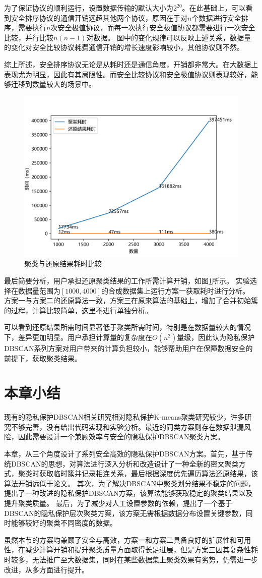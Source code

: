 为了保证协议的顺利运行，设置数据传输的默认大小为$ 2^{20} $。在此基础上，可以看到安全排序协议的通信开销远超其他两个协议，原因在于对$ n $个数据进行安全排序，需要执行$ n $次安全极值协议，而每一次执行安全极值协议都需要进行一次安全比较，并行比较$ n(n-1) $对数据。
图中的变化规律可以反映上述关系，数据量的变化对安全比较协议耗费通信开销的增长速度影响较小，其他协议则不然。

综上所述，安全排序协议无论是从耗时还是通信角度，开销都非常大。在大数据上表现尤为明显，因此有其局限性。而安全比较协议和安全极值协议则表现较好，能够迁移到数量较大的场景中。
\begin{figure}[htbp]
	\centering
	\includegraphics[width=0.6\linewidth]{img/testrc.png}
	\caption{聚类与还原结果耗时比较}
	\label{s4-exp-recover}
\end{figure}

最后简要分析，用户承担还原聚类结果的工作所需计算开销，如图\ref{s4-exp-recover}所示。
实验选择在数据量范围为$ [1000,4000] $的合成数据集上运行方案一获取耗时进行分析。
方案一与方案二的还原算法一致，方案三在原来算法的基础上，增加了合并初始簇的过程，计算比较简单，这里不进行单独分析。

可以看到还原结果所需时间显著低于聚类所需时间，特别是在数据量较大的情况下，差异更加明显。用户承担计算量的复杂度在$ O(n^2) $量级，因此认为隐私保护DBSCAN系列方案对用户带来的计算负担较小，能够帮助用户在保障数据安全的前提下，获取聚类结果。

\section{本章小结}
\label{s4-xiaojie}
现有的隐私保护DBSCAN相关研究相对隐私保护K-means聚类研究较少，许多研究不够完善，没有给出代码实现和实验分析。最近的同类方案\cite{bozdemir2021privacy}则存在数据泄漏风险，因此需要设计一个兼顾效率与安全的隐私保护DBSCAN聚类方案。

本章，从三个角度设计了系列安全高效的隐私保护DBSCAN方案。首先，基于传统DBSCAN的思想，对算法进行深入分析和改造设计了一种全新的密文聚类方式，聚类时获取临时簇并记录相连关系，最后根据深度优先遍历算法还原结果，该算法开销远低于论文\cite{bozdemir2021privacy}。
其次，为了解决DBSCAN中聚类划分结果不稳定的问题，提出了一种改进的隐私保护DBSCAN方案，该算法能够获取稳定的聚类结果以及提升聚类质量。
最后，为了减少对人工设置参数的依赖，提出了一个基于DBSCAN的隐私保护层次聚类方案，该方案无需根据数据分布设置关键参数，同时能够较好的聚类不同密度的数据。

虽然本节的方案均兼顾了安全与高效，方案一和方案二具备良好的扩展性和可用性，在减少计算开销和提升聚类质量方面取得长足进展，但是方案三因其复杂性耗时较多，无法推广至大数据集，同时在某些数据集上聚类效果有劣势，仍需进一步改进，从多方面进行提升。